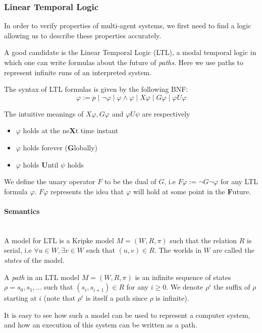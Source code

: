\documentclass[12]{article}
\newenvironment{definition}[1][Definition]{\begin{trivlist}
\item[\hskip \labelsep {\bfseries #1}]}{\end{trivlist}}
\newcommand{\myparagraph}[1]{\paragraph{#1}\mbox{}\\}
\begin{document}
\subsubsection{Linear Temporal Logic} 
\label{LTL}

In order to verify properties of multi-agent systems, we first need to find a logic allowing us to describe these properties accurately. 

A good candidate is the Linear Temporal Logic (LTL), a modal temporal logic in which one can write formulas about the future of \emph{paths}. Here we use paths to represent infinite runs of an interpreted system. 

\begin{definition} 
The syntax of LTL formulas is given by the following BNF: 
$$\varphi := p \mid \lnot\varphi \mid \varphi \land \varphi \mid X\varphi \mid G\varphi \mid \varphi U\varphi$$
\end{definition}

The intuitive meanings of $X\varphi, G\varphi$ and $\varphi U\psi$ are respectively 
\begin{itemize} 
\item $\varphi$ holds at the ne\textbf{X}t time instant
\item $\varphi$ holds forever (\textbf{G}lobally)
\item $\varphi$ holds \textbf{U}ntil $\psi$ holds  
\end{itemize}

We define the unary operator $F$ to be the dual of $G$, i.e $F\varphi := \lnot G\lnot\varphi$ for any LTL formula $\varphi$. $F\varphi$ represents the idea that $\varphi$ will hold at some point in the \textbf{F}uture.   

\myparagraph{Semantics} 

A model for LTL is a Kripke model $M = (W, R, \pi)$ such that the relation $R$ is serial, i.e $\forall u \in W,  \exists v \in W$ such that $(u, v) \in R$.
The worlds in $W$ are called the \textit{states} of the model. 

\begin{definition} 
A \textit{path} in an LTL model $M = (W, R, \pi)$ is an infinite sequence of states $\rho = s_0, s_1, ...$ such that $(s_i, s_{i+1}) \in R$ for any $i \geq 0$.
We denote $\rho^i$ the suffix of $\rho$ starting at $i$ (note that $\rho^i$ is itself a path since $\rho$ is infinite).
\end{definition}

It is easy to see how such a model can be used to represent a computer system, and how an execution of this system can be written as a path.
\end{document}
